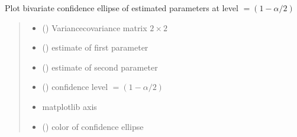 \documentclass[letterpaper,10pt,english]{sphinxmanual}
\begin{document}
\begin{fulllineitems}
\label{\detokenize{cubmods:cubmods.general.conf_ell}}
\pysigstartsignatures
{}
\pysigstopsignatures
\sphinxAtStartPar
Plot bivariate confidence ellipse of estimated
parameters at level \(=(1 - \alpha/2)\)
\begin{quote}\begin{description}
\begin{itemize}
\item {} 
\sphinxAtStartPar
{} () \textendash{} Variance\sphinxhyphen{}covariance matrix \(2 \times 2\)

\item {} 
\sphinxAtStartPar
{} () \textendash{} estimate of first parameter

\item {} 
\sphinxAtStartPar
{} () \textendash{} estimate of second parameter

\item {} 
\sphinxAtStartPar
{} () \textendash{} confidence level \(=(1 - \alpha/2)\)

\item {} 
\sphinxAtStartPar
{} \textendash{} matplotlib axis

\item {} 
\sphinxAtStartPar
{} () \textendash{} color of confidence ellipse


\end{itemize}
\end{description}
\end{quote}
\end{fulllineitems}
\end{document}
